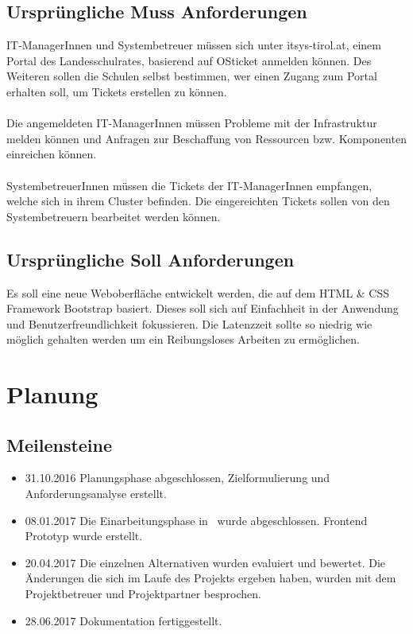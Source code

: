 \subsection{Ursprüngliche Muss Anforderungen}
IT-ManagerInnen und Systembetreuer müssen sich unter itsys-tirol.at, einem Portal des Landesschulrates, basierend auf OSticket anmelden können. Des Weiteren sollen die Schulen selbst bestimmen, wer einen Zugang zum Portal erhalten soll, um Tickets erstellen zu können.
\paragraph{}
Die angemeldeten IT-ManagerInnen müssen Probleme mit der Infrastruktur melden können und Anfragen zur Beschaffung von Ressourcen bzw. Komponenten einreichen können.
\paragraph{}
SystembetreuerInnen müssen die Tickets der IT-ManagerInnen empfangen, welche sich in ihrem Cluster befinden. Die eingereichten Tickets sollen von den Systembetreuern bearbeitet werden können.

\subsection{Ursprüngliche Soll Anforderungen}
Es soll eine neue Weboberfläche entwickelt werden, die auf dem HTML \& CSS Framework Bootstrap basiert. Dieses soll sich auf Einfachheit in der Anwendung und Benutzerfreundlichkeit fokussieren. Die Latenzzeit sollte so niedrig wie möglich gehalten werden um ein Reibungsloses Arbeiten zu ermöglichen.


\section{Planung}
\subsection{Meilensteine}
\begin{itemize}
	\item 31.10.2016 Planungsphase abgeschlossen, Zielformulierung und Anforderungsanalyse erstellt.
	\item 08.01.2017 Die Einarbeitungsphase in \getOst\ wurde abgeschlossen. Frontend Prototyp wurde erstellt.
	\item 20.04.2017 Die einzelnen Alternativen wurden evaluiert und bewertet. Die Änderungen die sich im Laufe des Projekts ergeben haben, wurden mit dem Projektbetreuer und Projektpartner besprochen.
	\item 28.06.2017 Dokumentation fertiggestellt.
\end{itemize}

